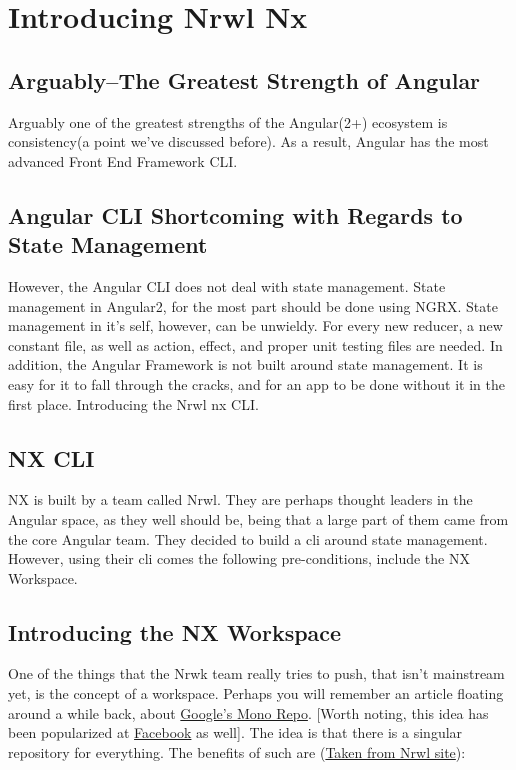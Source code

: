 \maketitle{}
\section{Introducing Nrwl Nx}

\subsection{Arguably–The Greatest Strength of Angular}

Arguably one of the greatest strengths of the Angular(2+) ecosystem is
consistency(a point we've discussed before). As a result, Angular has the most
advanced Front End Framework CLI.

\subsection{Angular CLI Shortcoming with Regards to State Management}

However, the Angular CLI does not deal with state management. State management
in Angular2, for the most part should be done using NGRX. State management in
it's self, however, can be unwieldy. For every new reducer, a new constant file,
as well as action, effect, and proper unit testing files are needed.
In addition, the Angular Framework is not built around state management. It is
easy for it to fall through the cracks, and for an app to be done without it in
the first place. Introducing the Nrwl nx CLI.

\subsection{NX CLI}
NX is built by a team called Nrwl. They are perhaps thought leaders in the
Angular space, as they well should be, being that a large part of them came
from the core Angular team. They decided to build a cli around state management.
However, using their cli comes the following pre-conditions, include the NX
Workspace.

\subsection{Introducing the NX Workspace}
One of the things that the Nrwk team really tries to push, that isn't mainstream
yet, is the concept of a workspace. Perhaps you will remember an article
floating around a while back, about
\href{https://cacm.acm.org/magazines/2016/7/204032-why-google-stores-billions-of-lines-of-code-in-a-single-repository/fulltext}
{Google's Mono Repo}. [Worth noting, this idea
has been popularized at
\href{https://code.facebook.com/posts/218678814984400/scaling-mercurial-at-facebook/}{Facebook}
as well]. The idea is that there is a singular repository for everything.
The benefits of such are
(\href{https://nrwl.io/nx/why-a-workspace}{Taken from Nrwl site}):


